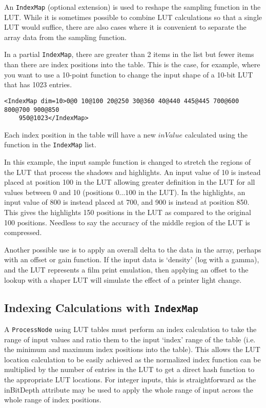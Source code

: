 An \texttt{IndexMap} (optional extension) is used to reshape the sampling function in the LUT.  While it is sometimes possible to combine LUT calculations so that a single LUT would suffice, there are also cases where it is convenient to separate the array data from the sampling function.

In a partial \texttt{IndexMap}, there are greater than 2 items in the list but fewer items than there are index positions into the table. This is the case, for example, where you want to use a 10-point function to change the input shape of a 10-bit LUT that has 1023 entries.

\lstset{frame=none}
\begin{lstlisting}
<IndexMap dim=10>0@0 10@100 20@250 30@360 40@440 445@445 700@600 800@700 900@850 
    950@1023</IndexMap>
\end{lstlisting}
\lstset{frame=single}

Each index position in the table will have a new $inValue$ calculated using the function in the \texttt{IndexMap} list.

In this example, the input sample function is changed to stretch the regions of the LUT that process the shadows and highlights. An input value of 10 is instead placed at position 100 in the LUT allowing greater definition in the LUT for all values between 0 and 10 (positions $0 \ldots 100$ in the LUT). In the highlights, an input value of 800 is instead placed at 700, and 900 is instead at position 850. This gives the highlights 150 positions in the LUT as compared to the original 100 positions. Needless to say the accuracy of the middle region of the LUT is compressed.

Another possible use is to apply an overall delta to the data in the array, perhaps with an offset or gain function. If the input data is `density' (log with a gamma), and the LUT represents a film print emulation, then applying an offset to the lookup with a shaper LUT will simulate the effect of a printer light change.

\subsection*{Indexing Calculations with \texttt{IndexMap}}
A \texttt{ProcessNode} using LUT tables must perform an index calculation to take the range of input values and ratio them to the input `index' range of the table (i.e. the minimum and maximum index positions into the table). This allows the LUT location calculation to be easily achieved as the normalized index function can be multiplied by the number of entries in the LUT to get a direct hash function to the appropriate LUT locations. For integer inputs, this is straightforward as the inBitDepth attribute may be used to apply the whole range of input across the whole range of index positions.

